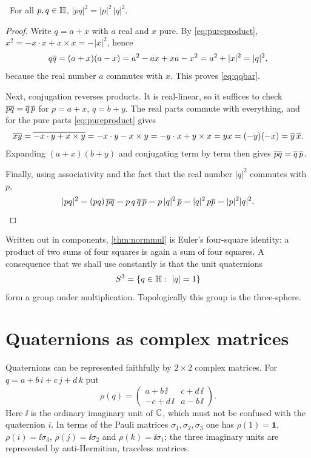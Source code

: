 \begin{theorem}\label{thm:normmul}\ver\
For all $p,q\in\mathbb{H}$, $|pq|^2=|p|^2\,|q|^2$.
\end{theorem}

\begin{proof}
Write $q=a+x$ with $a$ real and $x$ pure. By \eqref{eq:pureproduct}, $x^2=-x\cdot x+x\times x=-|x|^2$, hence
\[
q\overline{q}=(a+x)(a-x)=a^2-ax+xa-x^2=a^2+|x|^2=|q|^2,
\]
because the real number $a$ commutes with $x$. This proves \eqref{eq:qqbar}.

Next, conjugation reverses products. It is real-linear, so it suffices to check $\overline{pq}=\overline{q}\,\overline{p}$ for $p=a+x$, $q=b+y$. The real parts commute with everything, and for the pure parts \eqref{eq:pureproduct} gives
\[
\overline{xy}=\overline{-x\cdot y+x\times y}=-x\cdot y-x\times y=-y\cdot x+y\times x=yx=(-y)(-x)=\overline{y}\,\overline{x} .
\]
Expanding $(a+x)(b+y)$ and conjugating term by term then gives $\overline{pq}=\overline{q}\,\overline{p}$.

Finally, using associativity and the fact that the real number $|q|^2$ commutes with $p$,
\[
|pq|^2=(pq)\,\overline{pq}=p\,q\,\overline{q}\,\overline{p}=p\,|q|^2\,\overline{p}=|q|^2\,p\overline{p}=|p|^2|q|^2 .\qedhere
\]
\end{proof}

Written out in components, \cref{thm:normmul} is Euler's four-square identity: a product of two sums of four squares is again a sum of four squares. A consequence that we shall use constantly is that the unit quaternions
\[
S^3=\{q\in\mathbb{H}:\ |q|=1\}
\]
form a group under multiplication. Topologically this group is the three-sphere.

\section{Quaternions as complex matrices}

Quaternions can be represented faithfully by $2\times2$ complex matrices. For $q=a+b\,i+c\,j+d\,k$ put
\begin{equation}\label{eq:rho}
\rho(q)=\begin{pmatrix} a+b\,\ii & c+d\,\ii\\ -c+d\,\ii & a-b\,\ii\end{pmatrix}.
\end{equation}
Here $\ii$ is the ordinary imaginary unit of $\mathbb{C}$, which must not be confused with the quaternion $i$. In terms of the Pauli matrices $\sigma_1,\sigma_2,\sigma_3$ one has $\rho(1)=\mathbf 1$, $\rho(i)=\ii\sigma_3$, $\rho(j)=\ii\sigma_2$ and $\rho(k)=\ii\sigma_1$; the three imaginary units are represented by anti-Hermitian, traceless matrices.

